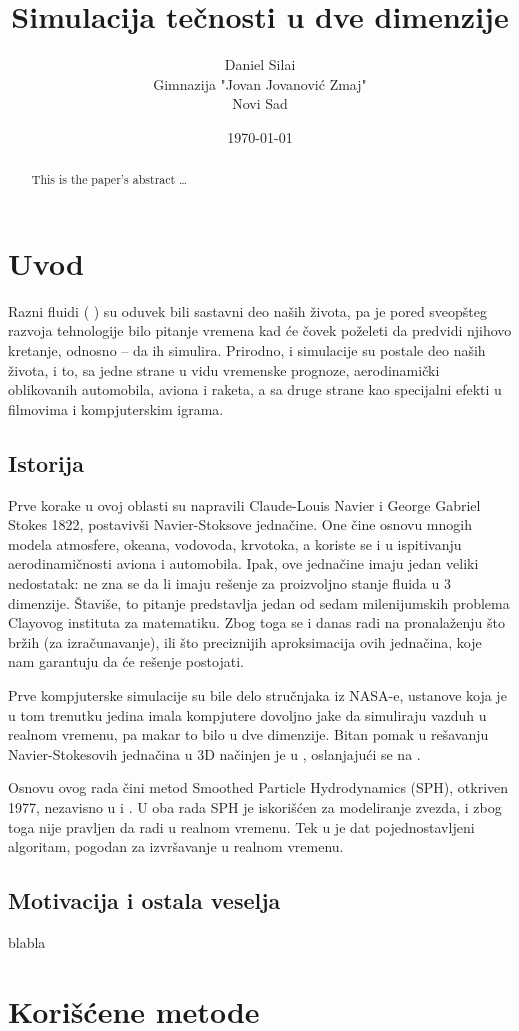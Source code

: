 \documentclass[12pt]{article}
\title{Simulacija te\v cnosti u dve dimenzije}
\author{
        Daniel Sila\dj i \\
        Gimnazija "Jovan Jovanovi\'{c} Zmaj"\\
		Novi Sad
}
\date{\today}
\begin{document}
\maketitle

\begin{abstract}
This is the paper's abstract \ldots
\end{abstract}

\section{Uvod}\label{uvod}
    Razni fluidi ( ) su oduvek bili sastavni deo na\v sih \v zivota, pa je pored sveop\v steg razvoja tehnologije bilo pitanje vremena kad \'ce \v covek po\v zeleti da predvidi njihovo kretanje, odnosno -- da ih simulira.
    Prirodno, i simulacije su postale deo na\v sih \v zivota, i to, sa jedne strane u vidu vremenske prognoze, aerodinami\v cki oblikovanih automobila, aviona i raketa, a sa druge strane kao specijalni efekti u filmovima i kompjuterskim igrama.

    \subsection{Istorija}\label{istorija}
        Prve korake u ovoj oblasti su napravili Claude-Louis Navier i George Gabriel Stokes 1822, postaviv\v si Navier-Stoksove jedna\v cine.
        One \v cine osnovu mnogih modela atmosfere, okeana, vodovoda, krvotoka, a koriste se i u ispitivanju aerodinami\v cnosti aviona i automobila.
        Ipak, ove jedna\v cine imaju jedan veliki nedostatak: ne zna se da li imaju re\v senje za proizvoljno stanje fluida u 3 dimenzije.
        \v Stavi\v se, to pitanje predstavlja jedan od sedam milenijumskih problema Clayovog instituta za matematiku.
        Zbog toga se i danas radi na pronala\v zenju \v sto br\v zih (za izra\v cunavanje), ili \v sto preciznijih aproksimacija ovih jedna\v cina, koje nam garantuju da \'ce re\v senje postojati.

        Prve kompjuterske simulacije su bile delo stru\v cnjaka iz NASA-e, ustanove koja je u tom trenutku jedina imala kompjutere dovoljno jake da simuliraju vazduh u realnom vremenu, pa makar to bilo u dve dimenzije. Bitan pomak u re\v savanju Navier-Stokesovih jedna\v cina u 3D na\v cinjen je u \cite{Foster:1996:RAL:244304.244315}, oslanjaju\'ci se na \cite{harlow:2182}.

        Osnovu ovog rada \v cini metod Smoothed Particle Hydrodynamics (SPH), otkriven 1977, nezavisno u \cite{1977MNRAS.181..375G} i \cite{1977AJ.....82.1013L}. U oba rada SPH je iskori\v s\'cen za modeliranje zvezda, i zbog toga nije pravljen da radi u realnom vremenu. Tek u \cite{Muller:2003:PFS:846276.846298} je dat pojednostavljeni algoritam, pogodan za izvr\v savanje u realnom vremenu.

    \subsection{Motivacija i ostala veselja}\label{motivacija}
        blabla 

\section{Kori\v s\'cene metode}
    



\end{document}
